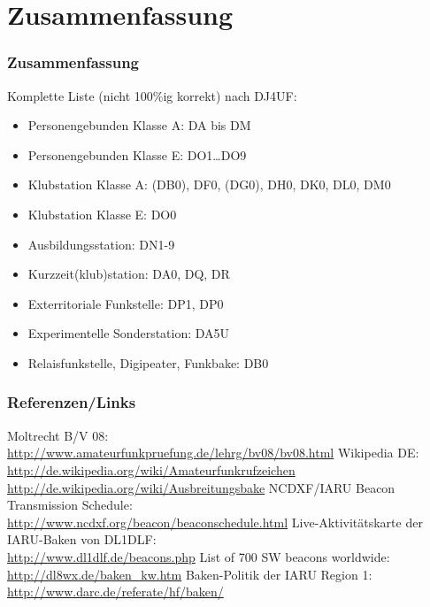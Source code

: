 \section{Zusammenfassung}

\begin{frame}
    \frametitle{Zusammenfassung}

    Komplette Liste (nicht 100\%ig korrekt) nach DJ4UF\hyperlink{refs}{\cite{dj4uf}}:

    \begin{itemize}
        \item Personengebunden Klasse A: DA bis DM
        \item Personengebunden Klasse E: DO1…DO9
        \item Klubstation Klasse A: (DB0), DF0, (DG0), DH0, DK0, DL0, DM0
        \item Klubstation Klasse E: DO0
        \item Ausbildungsstation: DN1-9
        \item Kurzzeit(klub)station: DA0, DQ, DR
        \item Exterritoriale Funkstelle: DP1, DP0
        \item Experimentelle Sonderstation: DA5U
        \item Relaisfunkstelle, Digipeater, Funkbake: DB0  
    \end{itemize}
   
\end{frame}

\renewcommand{\refname}{Referenzen}

\begin{frame}
    \frametitle{Referenzen/Links}
    \hypertarget{refs}{}
    \footnotesize

    \begin{thebibliography}{}
         Moltrecht B/V 08: \\
                        \url{http://www.amateurfunkpruefung.de/lehrg/bv08/bv08.html}
            Wikipedia DE: \\
                        \url{http://de.wikipedia.org/wiki/Amateurfunkrufzeichen} \\
                        \url{http://de.wikipedia.org/wiki/Ausbreitungsbake}
           NCDXF/IARU Beacon Transmission Schedule: \\
                        \url{http://www.ncdxf.org/beacon/beaconschedule.html}
          Live-Aktivitätskarte der IARU-Baken von DL1DLF: \\
                        \url{http://www.dl1dlf.de/beacons.php}
         List of 700 SW beacons worldwide: \\
                        \url{http://dl8wx.de/baken_kw.htm}
          Baken-Politik der IARU Region 1: \\
                        \url{http://www.darc.de/referate/hf/baken/}
    \end{thebibliography} 
   
\end{frame}


